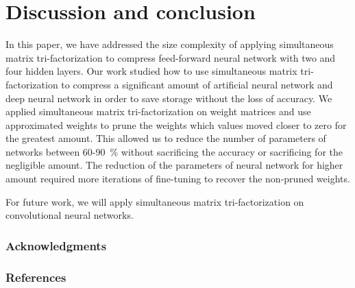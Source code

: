 \documentclass{article} %
\begin{document}
\section{Discussion and conclusion}
In this paper, we have addressed the size complexity of applying simultaneous 
matrix tri-factorization to compress feed-forward neural network with two and 
four hidden layers. Our work studied how to use simultaneous matrix 
tri-factorization to compress a significant amount of artificial neural network 
and deep neural network in order to save storage without the loss of accuracy. 
We applied simultaneous matrix tri-factorization on weight matrices and use 
approximated weights to prune the weights which values moved closer to zero for 
the greatest amount. This allowed us to reduce the number of parameters of 
networks between 60-90~\% without sacrificing the accuracy or sacrificing for 
the negligible amount. The reduction of the parameters of neural network for 
higher amount required more iterations of fine-tuning to recover the non-pruned 
weights. 

For future work, we will apply simultaneous matrix tri-factorization on 
convolutional neural networks.




\subsubsection*{Acknowledgments}


\subsubsection*{References}



\todos
\end{document}
